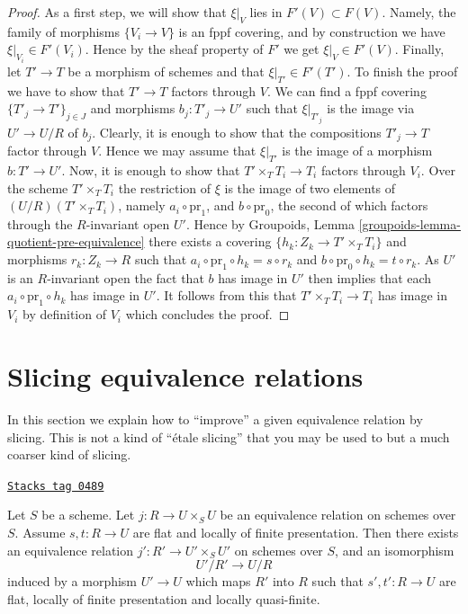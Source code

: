 \begin{proof}
\medskip\noindent
As a first step, we will show that $\xi|_V$ lies in $F'(V) \subset F(V)$.
Namely, the family of morphisms $\{V_i \to V\}$ is an fppf covering,
and by construction we have $\xi|_{V_i} \in F'(V_i)$.
Hence by the sheaf property of $F'$ we get $\xi|_V \in F'(V)$.
Finally, let $T' \to T$ be a morphism of schemes and
that $\xi|_{T'} \in F'(T')$. To finish the proof we have to show that
$T' \to T$ factors through $V$.
We can find a fppf covering $\{T'_j \to T'\}_{j \in J}$ and morphisms
$b_j : T'_j \to U'$ such that $\xi|_{T'_j}$ is the image via
$U' \to U/R$ of $b_j$. Clearly, it is enough to show that the compositions
$T'_j \to T$ factor through $V$. Hence we may assume that $\xi|_{T'}$
is the image of a morphism $b : T' \to U'$. Now, it is enough to show
that $T'\times_T T_i \to T_i$ factors through $V_i$. Over the scheme
$T' \times_T T_i$ the restriction of $\xi$ is the image of two
elements of $(U/R)(T' \times_T T_i)$, namely $a_i \circ \text{pr}_1$, and
$b \circ \text{pr}_0$, the second of which factors through the $R$-invariant
open $U'$. Hence by
Groupoids, Lemma \ref{groupoids-lemma-quotient-pre-equivalence}
there exists a covering $\{h_k : Z_k \to T' \times_T T_i\}$ and morphisms
$r_k : Z_k \to R$ such that $a_i \circ \text{pr}_1 \circ h_k = s \circ r_k$
and $b \circ \text{pr}_0 \circ h_k = t \circ r_k$. As $U'$ is an $R$-invariant
open the fact that $b$ has image in $U'$ then implies that each
$a_i \circ \text{pr}_1 \circ h_k$ has image in $U'$. It follows from this
that $T' \times_T T_i \to T_i$ has image in $V_i$ by definition of $V_i$
which concludes the proof.
\end{proof}

\section{Slicing equivalence relations}
\label{bootstrap-section-slicing}
In this section we explain how to ``improve'' a given equivalence
relation by slicing. This is not a kind of ``\'etale slicing'' that you
may be used to but a much coarser kind of slicing.


\begin{lemma}
\label{bootstrap-lemma-slice-equivalence-relation}
\href{https://stacks.math.columbia.edu/tag/0489}{\texttt{Stacks tag 0489}}

Let $S$ be a scheme.
Let $j : R \to U \times_S U$ be an equivalence relation on schemes over $S$.
Assume $s, t : R \to U$ are flat and locally of finite presentation.
Then there exists an equivalence relation $j' : R' \to U'\times_S U'$
on schemes over $S$, and an isomorphism
$$
U'/R' \longrightarrow U/R
$$
induced by a morphism $U' \to U$ which maps $R'$ into $R$ such that
$s', t' : R \to U$ are flat, locally of finite presentation
and locally quasi-finite.
\end{lemma}

